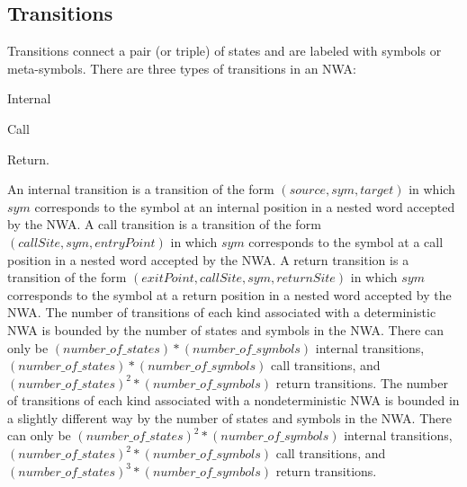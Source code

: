\documentclass{llncs}
\begin{document}
\subsection{Transitions}
\label{Se:Transitions}

Transitions connect a pair (or triple) of states and are labeled with symbols
or meta-symbols.  There are three types of transitions in an
NWA: \begin{inparaenum} \item Internal \item Call \item
  Return. \end{inparaenum} An internal transition is a transition of the form
$(source, sym, target)$ in which $sym$ corresponds to the symbol at an
internal position in a nested word accepted by the NWA.  A call transition is
a transition of the form $(callSite, sym, entryPoint)$ in which $sym$
corresponds to the symbol at a call position in a nested word accepted by the
NWA.  A return transition is a transition of the form $(exitPoint, callSite,
sym, returnSite)$ in which $sym$ corresponds to the symbol at a return
position in a nested word accepted by the NWA.  The number of transitions of
each kind associated with a deterministic NWA is bounded by the number of
states and symbols in the NWA.  There can only be
$(number\_of\_states)*(number\_of\_symbols)$ internal transitions,
$(number\_of\_states)*(number\_of\_symbols)$ call transitions, and
$(number\_of\_states)^2*(number\_of\_symbols)$ return transitions.  The
number of transitions of each kind associated with a nondeterministic NWA is
bounded in a slightly different way by the number of states and symbols in
the NWA.  There can only be $(number\_of\_states)^2*(number\_of\_symbols)$
internal transitions, $(number\_of\_states)^2*(number\_of\_symbols)$ call
transitions, and $(number\_of\_states)^3*(number\_of\_symbols)$ return
transitions.
\end{document}
